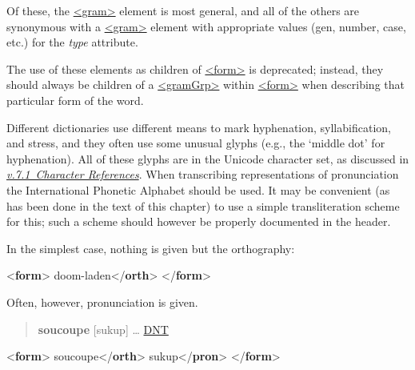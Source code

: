  Of these, the \hyperref[TEI.gram]{<gram>} element is most general, and all of the others are synonymous with a \hyperref[TEI.gram]{<gram>} element with appropriate values (gen, number, case, etc.) for the {\itshape type} attribute.\par
The use of these elements as children of \hyperref[TEI.form]{<form>} is deprecated; instead, they should always be children of a \hyperref[TEI.gramGrp]{<gramGrp>} within \hyperref[TEI.form]{<form>} when describing that particular form of the word.\par
Different dictionaries use different means to mark hyphenation, syllabification, and stress, and they often use some unusual glyphs (e.g., the ‘middle dot’ for hyphenation). All of these glyphs are in the Unicode character set, as discussed in \textit{\hyperref[SG-er]{v.7.1\ Character References}}. When transcribing representations of pronunciation the International Phonetic Alphabet should be used. It may be convenient (as has been done in the text of this chapter) to use a simple transliteration scheme for this; such a scheme should however be properly documented in the header.\par
In the simplest case, nothing is given but the orthography:\par\bgroup{}\exampleFont \begin{shaded}\noindent\mbox{}{<\textbf{form}>}\mbox{}\newline 
{}doom-laden{</\textbf{orth}>}\mbox{}\newline 
{</\textbf{form}>}\end{shaded}\egroup\par \par
Often, however, pronunciation is given.
\begin{quote}{\bfseries soucoupe} [sukup] … \hyperref[DIC-DNT]{DNT}\end{quote}
 \par\bgroup{}\exampleFont \begin{shaded}\noindent\mbox{}{<\textbf{form}>}\mbox{}\newline 
{}soucoupe{</\textbf{orth}>}\mbox{}\newline 
{}sukup{</\textbf{pron}>}\mbox{}\newline 
{</\textbf{form}>}\end{shaded}\egroup\par \par
